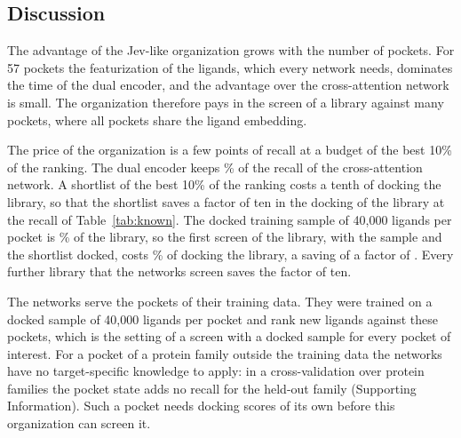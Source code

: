 \subsection{Discussion}

The advantage of the Jev-like organization grows with the number of pockets. For 57 pockets the featurization of the ligands, which every network needs, dominates the time of the dual encoder, and the advantage over the cross-attention network is small. The organization therefore pays in the screen of a library against many pockets, where all pockets share the ligand embedding.

The price of the organization is a few points of recall at a budget of the best 10\% of the ranking. The dual encoder keeps \kfRatioDual{}\% of the recall of the cross-attention network. A shortlist of the best 10\% of the ranking costs a tenth of docking the library, so that the shortlist saves a factor of ten in the docking of the library at the recall of Table~\ref{tab:known}. The docked training sample of 40{,}000 ligands per pocket is \trainShareLib{}\% of the library, so the first screen of the library, with the sample and the shortlist docked, costs \shareLabelShortlist{}\% of docking the library, a saving of a factor of \factorLabelShortlist{}. Every further library that the networks screen saves the factor of ten.

The networks serve the pockets of their training data. They were trained on a docked sample of 40{,}000 ligands per pocket and rank new ligands against these pockets, which is the setting of a screen with a docked sample for every pocket of interest. For a pocket of a protein family outside the training data the networks have no target-specific knowledge to apply: in a cross-validation over protein families the pocket state adds no recall for the held-out family (Supporting Information). Such a pocket needs docking scores of its own before this organization can screen it.
